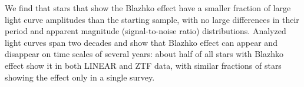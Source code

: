 

We find that stars that show the Blazhko effect have a smaller fraction of
large light curve amplitudes than the starting sample, with no large differences in their period and apparent
magnitude (signal-to-noise ratio) distributions. Analyzed light curves span two decades and show that Blazhko
effect can appear and disappear on time scales of several years: about half of all stars with Blazhko effect show
it in both LINEAR and ZTF data, with similar fractions of stars showing the effect only in a single survey.  